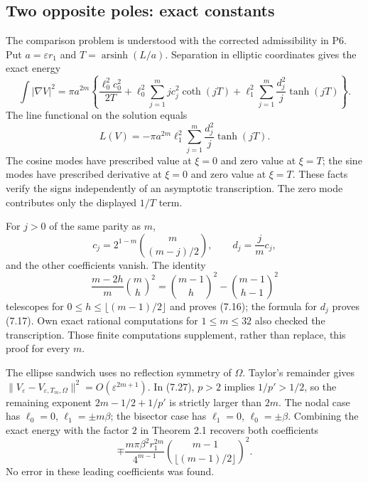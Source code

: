 \documentclass[10pt]{article}
\begin{document}
\subsection*{Two opposite poles: exact constants}
The comparison problem is understood with the corrected admissibility in P6. Put \(a=\varepsilon r_1\) and \(T=\operatorname{arsinh}(L/a)\). Separation in elliptic coordinates gives the exact energy \[\int |\nabla V|^2
 =\pi a^{2m}\left\{
 \frac{\ell_0^2c_0^2}{2T}
 +\ell_0^2\sum_{j=1}^m j c_j^2\coth(jT)
 +\ell_1^2\sum_{j=1}^m\frac{d_j^2}{j}\tanh(jT)
 \right\}.\] The line functional on the solution equals \[L(V)=-\pi a^{2m}\ell_1^2
                 \sum_{j=1}^m\frac{d_j^2}{j}\tanh(jT).\] The cosine modes have prescribed value at \(\xi=0\) and zero value at \(\xi=T\); the sine modes have prescribed derivative at \(\xi=0\) and zero value at \(\xi=T\). These facts verify the signs independently of an asymptotic transcription. The zero mode contributes only the displayed \(1/T\) term.\par
For \(j>0\) of the same parity as \(m\), \[c_j=2^{1-m}\binom m{(m-j)/2},\qquad d_j=\frac jm c_j,\] and the other coefficients vanish. The identity \[\frac{m-2h}{m}\binom mh^2
   =\binom{m-1}h^2-\binom{m-1}{h-1}^2\] telescopes for \(0\le h\le\lfloor(m-1)/2\rfloor\) and proves (7.16); the formula for \(d_j\) proves (7.17). Own exact rational computations for \(1\le m\le32\) also checked the transcription. Those finite computations supplement, rather than replace, this proof for every \(m\).\par
The ellipse sandwich uses no reflection symmetry of \(\Omega\). Taylor’s remainder gives \(\|V_\varepsilon-V_{\varepsilon,T_m,\Omega}\|^2=O(\varepsilon^{2m+1})\). In (7.27), \(p>2\) implies \(1/p'>1/2\), so the remaining exponent \(2m-1/2+1/p'\) is strictly larger than \(2m\). The nodal case has \(\ell_0=0\), \(\ell_1=\pm m\beta\); the bisector case has \(\ell_1=0\), \(\ell_0=\pm\beta\). Combining the exact energy with the factor \(2\) in Theorem 2.1 recovers both coefficients \[\mp\frac{m\pi\beta^2 r_1^{2m}}{4^{m-1}}
       \binom{m-1}{\lfloor(m-1)/2\rfloor}^{\!2}.\] No error in these leading coefficients was found.\par
\end{document}
